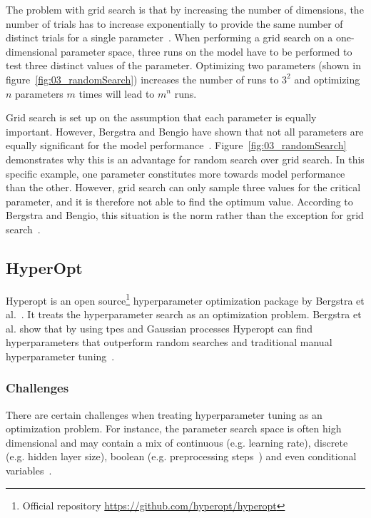The problem with grid search is that by increasing the number of dimensions, the number of trials has to increase exponentially to provide the same number of distinct trials for a single parameter~\cite{Bergstra2012a}. When performing a grid search on a one-dimensional parameter space, three runs on the model have to be performed to test three distinct values of the parameter. Optimizing two parameters {(shown in figure~\ref{fig:03_randomSearch})} increases the number of runs to $3^2$ and optimizing $n$ parameters $m$ times will lead to $m^n$ runs. 

Grid search is set up on the assumption that each parameter is equally important. However, Bergstra and Bengio have shown that not all parameters are equally significant for the model performance~\cite{Bergstra2012a}. Figure~\ref{fig:03_randomSearch} demonstrates why this is an advantage for random search over grid search. In this specific example, one parameter constitutes more towards model performance than the other. However, grid search can only sample three values for the critical parameter, and it is therefore not able to find the optimum value. According to Bergstra and Bengio, this situation is the norm rather than the exception for grid search~\cite{Bergstra2012a}.

\subsection{HyperOpt}

Hyperopt is an open source\footnote{Official repository \url{https://github.com/hyperopt/hyperopt}} hyperparameter optimization package by Bergstra et al.~\cite{Bergstra2013a}. It treats the hyperparameter search as an optimization problem. Bergstra et al. show that by using \glspl{tpe} and Gaussian processes Hyperopt can find hyperparameters that outperform random searches and traditional manual hyperparameter tuning~\cite{Bergstra2011}.




\subsubsection*{Challenges}

There are certain challenges when treating hyperparameter tuning as an optimization problem. For instance, the parameter search space is often high dimensional and may contain a mix of continuous {(e.g. learning rate)}, discrete {(e.g. hidden layer size)}, boolean {(e.g. preprocessing steps~\cite{Hutter2009})} and even conditional variables~\cite{Bergstra2013}. 

